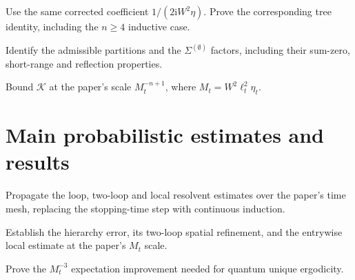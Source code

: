 \begin{lemma}\label{lem:ward-tree}
  Use the same corrected coefficient $1/(2\mathrm{i}W^2\eta)$.
  Prove the corresponding tree identity, including the $n\ge4$ inductive case.
\end{lemma}

\begin{lemma}\label{lem:tree-decomp}
  Identify the admissible partitions and the $\Sigma^{(\emptyset)}$ factors,
  including their sum-zero, short-range and reflection properties.
\end{lemma}

\begin{lemma}\label{lem:tree-bound}
  Bound $\mathcal K$ at the paper's scale
  $M_t^{-n+1}$, where $M_t=W^2\ell_t^2\eta_t$.
\end{lemma}

\chapter{Main probabilistic estimates and results}

\begin{lemma}\label{lem:loop-induction}
  Propagate the loop, two-loop and local resolvent estimates over the paper's
  time mesh, replacing the stopping-time step with continuous induction.
\end{lemma}

\begin{lemma}\label{lem:loop-estimates}
  Establish the hierarchy error, its two-loop spatial refinement, and the
  entrywise local estimate at the paper's $M_t$ scale.
\end{lemma}

\begin{lemma}\label{lem:loop-expectation}
  Prove the $M_t^{-3}$ expectation improvement needed for quantum unique
  ergodicity.
\end{lemma}

